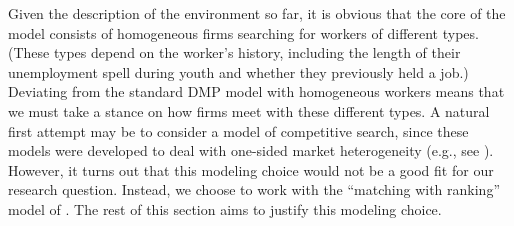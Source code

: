 \documentclass[12pt]{article} %
\theoremstyle{definition}
\begin{document}
Given the description of the environment so far, it is obvious that the core of the model consists of homogeneous firms searching for workers of different types. (These types depend on the worker's history, including the length of their unemployment spell during youth and whether they previously held a job.) Deviating from the standard DMP model with homogeneous workers means that we must take a stance on how firms meet with these different types.
A natural first attempt may be to consider a model of competitive search, since these models were developed to deal with one-sided market heterogeneity (e.g., see  \citealt{montgomery1991equilibrium}). 
However, it turns out that this modeling choice would not be a good fit for our research question. Instead, we choose to work with the ``matching with ranking'' model of \cite{petrongolo2001looking}. The rest of this section aims to justify this modeling choice. 
\end{document}
